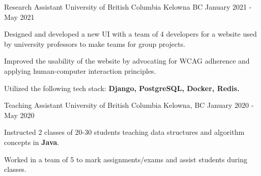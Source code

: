 \begin{cventries}


	\cventry
	{Research Assistant} %
	{University of British Columbia} %
	{Kelowna BC} %
	{January 2021 - May 2021} %
	{
		\begin{cvitems} %
			\item {Designed and developed a new UI with a team of 4 developers for a website used by university professors to make teams for group projects.}
			\item {Improved the usability of the website by advocating for WCAG adherence and applying human-computer interaction principles.}
			\item {Utilized the following tech stack:  \textbf{Django, PostgreSQL, Docker, Redis.}}
		\end{cvitems}
	}


	\cventry
	{Teaching Assistant} %
	{University of British Columbia} %
	{Kelowna, BC} %
	{January 2020 - May 2020} %
	{
		\begin{cvitems} %
			\item {Instructed 2 classes of 20-30 students teaching data structures and algorithm concepts in \textbf{Java}.}
			\item {Worked in a team of 5 to mark assignments/exams and assist students during classes.}
		\end{cvitems}
	}


\end{cventries}
